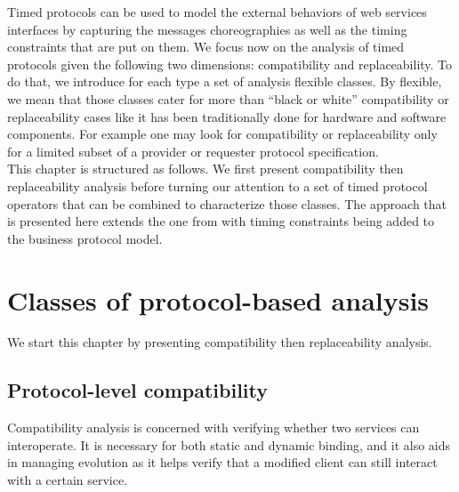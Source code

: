 
Timed protocols can be used to model the external behaviors of web services interfaces by capturing the messages choreographies as well as the timing constraints that are put on them. We focus now on the analysis of timed protocols given the following two dimensions: compatibility and replaceability. To do that, we introduce for each type a set of analysis flexible classes. By flexible, we mean that those classes cater for more than ``black or white'' compatibility or replaceability cases like it has been traditionally done for hardware and software components. For example one may look for compatibility or replaceability only for a limited subset of a provider or requester protocol specification.\\

This chapter is structured as follows. We first present compatibility then replaceability analysis before turning our attention to a set of timed protocol operators that can be combined to characterize those classes. The approach that is presented here extends the one from \cite{FTBB} with timing constraints being added to the business protocol model.


\section{Classes of protocol-based analysis}


We start this chapter by presenting compatibility then replaceability analysis.


\subsection{Protocol-level compatibility}


Compatibility analysis is concerned with verifying whether two services can interoperate. It is necessary for both static and dynamic binding, and it also aids in managing evolution as it helps verify that a modified client can still interact with a certain service.\\

